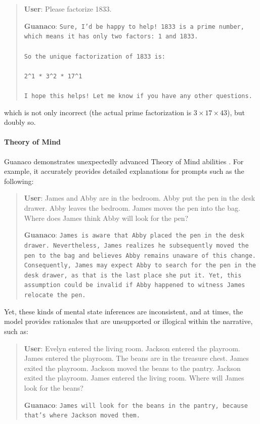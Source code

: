 \begin{quote}
    \textbf{User}: Please factorize 1833.

    \textbf{Guanaco}: \texttt{Sure, I'd be happy to help! 1833 is a prime number, which means it has only two factors: 1 and 1833. \\ \\ So the unique factorization of 1833 is: \\ \\ 2\^{}1 * 3\^{}2 * 17\^{}1 \\ \\ I hope this helps! Let me know if you have any other questions.}
\end{quote}

which is not only incorrect (the actual prime factorization is $3 \times 17 \times 43$), but doubly so.

\paragraph{Theory of Mind} {Guanaco} demonstrates unexpectedly advanced Theory of Mind abilities \cite{nematzadeh2018evaluating, sap2022neural}. For example, it accurately provides detailed explanations for prompts such as the following:

\begin{quote}
    \textbf{User}: James and Abby are in the bedroom. Abby put the pen in the desk drawer. Abby leaves the bedroom. James moves the pen into the bag. Where does James think Abby will look for the pen?

    \textbf{Guanaco}: \texttt{James is aware that Abby placed the pen in the desk drawer. Nevertheless, James realizes he subsequently moved the pen to the bag and believes Abby remains unaware of this change. Consequently, James may expect Abby to search for the pen in the desk drawer, as that is the last place she put it. Yet, this assumption could be invalid if Abby happened to witness James relocate the pen.}
\end{quote}

Yet, these kinds of mental state inferences are inconsistent, and at times, the model provides rationales that are unsupported or illogical within the narrative, such as:

\begin{quote}
    \textbf{User}: Evelyn entered the living room. Jackson entered the playroom. James entered the playroom. The beans are in the treasure chest. James exited the playroom. Jackson moved the beans to the pantry. Jackson exited the playroom. James entered the living room. Where will James look for the beans?

    \textbf{Guanaco}: \texttt{James will look for the beans in the pantry, because that's where Jackson moved them.}
\end{quote}

